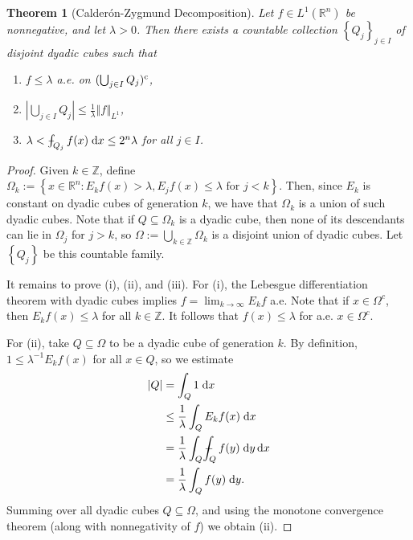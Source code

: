 \documentclass{book}
\newcommand{\bbR}{\mathbb{R}}
\newcommand{\bbZ}{\mathbb{Z}}
\renewcommand{\d}{\mathrm{d}}
\newcommand{\abs}[1]{\left\lvert {#1} \right\rvert}
\newcommand{\norm}[1]{\left\Vert {#1} \right\Vert}
\newcommand{\set}[1]{\left\{ {#1} \right\}}
\def\Xint#1{\mathchoice
{\XXint\displaystyle\textstyle{#1}}%
{\XXint\textstyle\scriptstyle{#1}}%
{\XXint\scriptstyle\scriptscriptstyle{#1}}%
{\XXint\scriptscriptstyle\scriptscriptstyle{#1}}%
\!\int}
\def\XXint#1#2#3{{\setbox0=\hbox{$#1{#2#3}{\int}$ }
\vcenter{\hbox{$#2#3$ }}\kern-.6\wd0}}
\def\dashint{\Xint-}
\newtheorem{theorem}{Theorem}[chapter]
\theoremstyle{definition}
\theoremstyle{remark}
\numberwithin{equation}{chapter}
\begin{document}
\begin{theorem}[Calder\'on-Zygmund Decomposition]
    Let $f \in L^1(\bbR^n)$ be nonnegative, and let $\lambda > 0$. Then there exists a countable collection $\set{Q_j}_{j \in I}$ of disjoint dyadic cubes such that
    \begin{enumerate}[label={\rm (\roman*)}]
        \item $f \leq \lambda$ a.e. on $(\bigcup_{j \in I} Q_j)^{\rm c}$,
        \item $\abs{\bigcup_{j \in I} Q_j} \leq \frac{1}{\lambda} \norm{f}_{L^1}$,
        \item $\lambda < \dashint_{Q_j} f(x) \; \d x \leq 2^n \lambda$ for all $j \in I$.
    \end{enumerate}
\end{theorem}
\begin{proof}
    Given $k \in \bbZ$, define $\Omega_k := \set{ x \in \bbR^n : E_kf(x) > \lambda, E_jf(x) \leq \lambda \text{ for } j < k }$. Then, since $E_k$ is constant on dyadic cubes of generation $k$, we have that $\Omega_k$ is a union of such dyadic cubes. Note that if $Q \subseteq \Omega_k$ is a dyadic cube, then none of its descendants can lie in $\Omega_j$ for $j > k$, so $\Omega := \bigcup_{k \in \bbZ} \Omega_k$ is a disjoint union of dyadic cubes. Let $\set{ Q_j }$ be this countable family.

    It remains to prove (i), (ii), and (iii). For (i), the Lebesgue differentiation theorem with dyadic cubes implies $f = \lim_{k \to \infty} E_k f$ a.e. Note that if $x \in \Omega^c$, then $E_k f(x) \leq \lambda$ for all $k \in \bbZ$. It follows that $f(x) \leq \lambda$ for a.e. $x \in \Omega^c$.

    For (ii), take $Q \subseteq \Omega$ to be a dyadic cube of generation $k$. By definition, $1 \leq \lambda^{-1} E_k f(x)$ for all $x \in Q$, so we estimate 
    \begin{equation} \begin{aligned}
        \abs{Q} &= \int_Q 1 \; \d x \\
                &\leq \frac{1}{\lambda} \int_Q E_k f(x) \; \d x \\
                &= \frac{1}{\lambda} \int_Q \dashint_Q f(y) \; \d y \, \d x \\
                &= \frac{1}{\lambda} \int_Q f(y) \; \d y.
    \end{aligned} \end{equation}
    Summing over all dyadic cubes $Q \subseteq \Omega$, and using the monotone convergence theorem (along with nonnegativity of $f$) we obtain (ii).


\end{proof}
\end{document}
